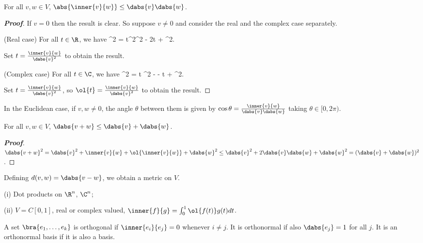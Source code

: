 \begin{lemma}
For all $v,w \in V$, $\abs{\inner{v}{w}} \leq  \dabs{v}\dabs{w}$.
\end{lemma}

\begin{proof}[\bf Proof]
If $v = 0$ then the result is clear. So suppose $v \neq 0$ and consider the real and the complex case separately.
\bit
\item (Real case) For all $t \in \R$, we have
 \leq  {}^2 = t^2^2 - 2t + ^2.
\ee

Set $t = \frac{\inner{v}{w}}{\dabs{v}^2}$ to obtain the result.
\item (Complex case) For all $t \in \C$, we have 
 \leq  {}^2 = t ^2 -   - t + ^2.
\ee

Set $t = \frac{\inner{v}{w}}{\dabs{v}^2}$, so $\ol{t} = \frac{\inner{v}{w}}{\dabs{v}^2}$ to obtain the result.
\eit
\end{proof}

\begin{lemma}
In the Euclidean case, if $v,w \neq 0$, the angle $\theta$ between them is given by $\cos \theta = \frac{\inner{v}{w}}{\dabs{v}\dabs{w}}$ taking $\theta \in [0, 2\pi)$.
\end{lemma}

\begin{lemma}
For all $v,w \in V$, $\dabs{v + w} \leq  \dabs{v} + \dabs{w}$.
\end{lemma}

\begin{proof}[\bf Proof]
$\dabs{v + w}^2 = \dabs{v}^2 + \inner{v}{w} + \ol{\inner{v}{w}} + \dabs{w}^2 \leq \dabs{v}^2 + 2\dabs{v}\dabs{w} + \dabs{w}^2 = (\dabs{v} + \dabs{w})^2$.
\end{proof}

\begin{remark}
Defining $d(v,w) = \dabs{v - w}$, we obtain a metric on $V$.
\end{remark}

\begin{example}
\ben
\item [(i)] Dot products on $\R^n$, $\C^n$;
\item [(ii)] $V = C[0, 1]$, real or complex valued, $\inner{f}{g} = \int^1_0 \ol{f(t)}g(t) dt$.
\een
\end{example}

\begin{definition}
A set $\bra{e_1, \dots, e_k}$ is orthogonal if $\inner{e_i}{e_j} = 0$ whenever $i \neq j$. It is orthonormal if also $\dabs{e_j} = 1$ for all $j$. It is an orthonormal basis if it is also a basis.
\end{definition}

